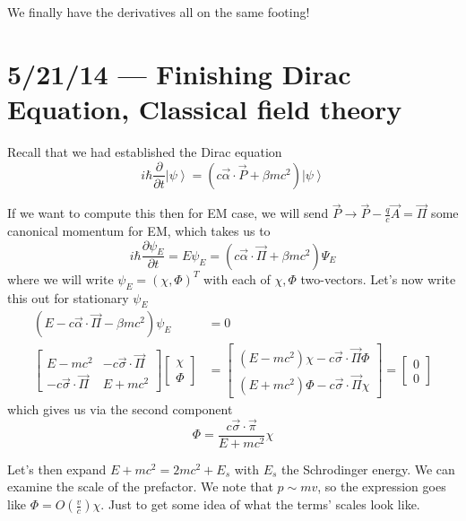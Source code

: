 \documentclass[10pt]{report}
\newcommand{\ket}[1]{\left|#1\right>}
\newcommand{\pd}[2]{\frac{\partial #1}{\partial#2}}
\begin{document}
We finally have the derivatives all on the same footing!
\chapter{5/21/14 --- Finishing Dirac Equation, Classical field theory}

Recall that we had established the Dirac equation
\begin{equation}
    i\hbar \pd{}{t}\ket{\psi} = (c\vec{\alpha} \cdot \vec{P} + \beta mc^2)\ket{\psi}
\end{equation}

If we want to compute this then for EM case, we will send $\vec{P} \to \vec{P} - \frac{q}{c}\vec{A} = \vec{\Pi}$ some canonical momentum for EM, which takes us to
\begin{equation}
    i\hbar \pd{\psi_E}{t} = E\psi_E = \left( c\vec{\alpha} \cdot \vec{\Pi} + \beta mc^2 \right)\Psi_E
\end{equation}
where we will write $\psi_E = \left( \chi, \Phi \right)^T$ with each of $\chi, \Phi$ two-vectors. Let's now write this out for stationary $\psi_E$
\begin{align}
    \left(E - c\vec{\alpha} \cdot \vec{\Pi} - \beta mc^2\right)\psi_E &= 0\\
    \begin{bmatrix} E-mc^2 & -c \vec{\sigma} \cdot \vec{\Pi} \\ -c\vec{\sigma} \cdot \vec{\Pi} & E + mc^2 \end{bmatrix} \begin{bmatrix} \chi \\ \Phi \end{bmatrix} &= \begin{bmatrix} \left( E - mc^2\right) \chi - c\vec{\sigma} \cdot \vec{\Pi} \Phi \\ \left( E + mc^2\right) \Phi - c\vec{\sigma} \cdot \vec{\Pi} \chi \end{bmatrix} = \begin{bmatrix} 0\\0 \end{bmatrix} \label{5.12.other}
\end{align}
which gives us via the second component
\begin{equation}
    \Phi = \frac{c\vec{\sigma} \cdot \vec{\pi}}{E + mc^2}\chi
\end{equation}

Let's then expand $E + mc^2 = 2mc^2 + E_s$ with $E_s$ the Schrodinger energy. We can examine the scale of the prefactor. We note that $p \sim mv$, so the expression goes like $\Phi = O\left( \frac{v}{c} \right)\chi$. Just to get some idea of what the terms' scales look like.
\end{document}
